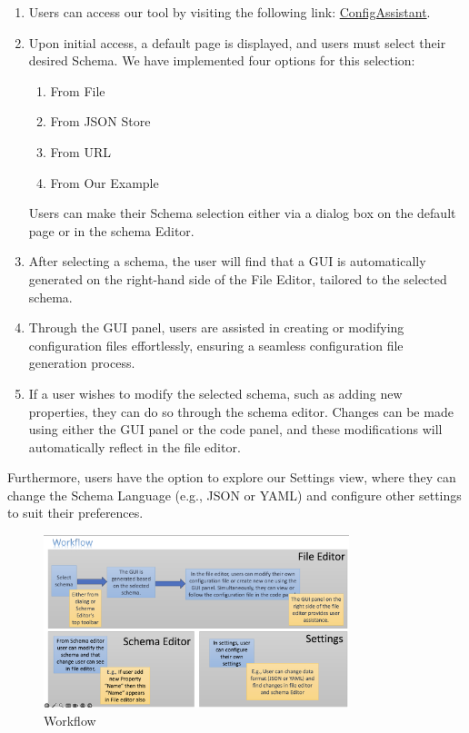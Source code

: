 \begin{enumerate}
    \item Users can access our tool by visiting the following link: \href{https://paulbredl.github.io/config-assistant/}{ConfigAssistant}.
    \item Upon initial access, a default page is displayed, and users must select their desired Schema. 
    We have implemented four options for this selection:
    \begin{enumerate}
        \item From File
        \item From JSON Store
        \item From URL
        \item From Our Example
    \end{enumerate}
    Users can make their Schema selection either via a dialog box on the default page or in the schema Editor.
    \item After selecting a schema, the user will find that a GUI is automatically generated on the right-hand side of the File Editor, tailored to the selected schema.
    \item Through the GUI panel, users are assisted in creating or modifying configuration files effortlessly, ensuring a seamless configuration file generation process.
    \item If a user wishes to modify the selected schema, such as adding new properties, they can do so through the schema editor. Changes can be made using either the GUI panel or the code panel, and these modifications will automatically reflect in the file editor.
\end{enumerate}

Furthermore, users have the option to explore our Settings view, where they can change the Schema Language (e.g., JSON or YAML) and configure other settings to suit their preferences.

\begin{figure}[!htb]
    \begin{minipage}[t]{0.5\textwidth}
        \includegraphics[width=3.5in]{figures/workflow}
        \caption{Workflow}
    \end{minipage}\label{fig:workflow}
\end{figure}

